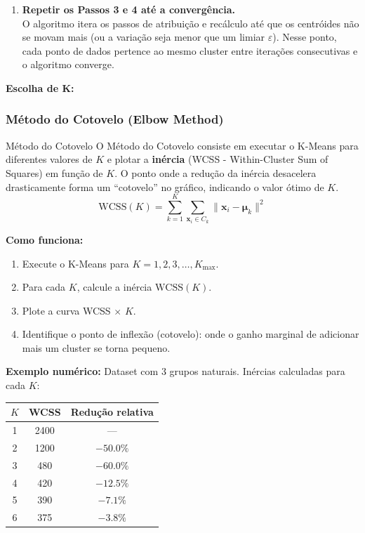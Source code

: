 \documentclass[12pt,a4paper]{article}
\begin{document}
\begin{enumerate}
  \item \textbf{Repetir os Passos 3 e 4 até a convergência.}\\
  O algoritmo itera os passos de atribuição e recálculo até que os centróides não se movam mais (ou a variação seja menor que um limiar $\varepsilon$). Nesse ponto, cada ponto de dados pertence ao mesmo cluster entre iterações consecutivas e o algoritmo converge.

\end{enumerate}

\textbf{Escolha de K:}

\subsubsection*{Método do Cotovelo (Elbow Method)}

\begin{definicaobox}{Método do Cotovelo}
O Método do Cotovelo consiste em executar o K-Means para diferentes valores de $K$ e plotar a \textbf{inércia} (WCSS - Within-Cluster Sum of Squares) em função de $K$. O ponto onde a redução da inércia desacelera drasticamente forma um ``cotovelo'' no gráfico, indicando o valor ótimo de $K$.
\[
  \text{WCSS}(K) = \sum_{k=1}^{K} \sum_{\mathbf{x}_i \in C_k} \|\mathbf{x}_i - \boldsymbol{\mu}_k\|^2
\]
\end{definicaobox}

\textbf{Como funciona:}
\begin{enumerate}
  \item Execute o K-Means para $K = 1, 2, 3, \ldots, K_{\max}$.
  \item Para cada $K$, calcule a inércia $\text{WCSS}(K)$.
  \item Plote a curva WCSS $\times$ $K$.
  \item Identifique o ponto de inflexão (cotovelo): onde o ganho marginal de adicionar mais um cluster se torna pequeno.
\end{enumerate}

\textbf{Exemplo numérico:} Dataset com 3 grupos naturais. Inércias calculadas para cada $K$:

\begin{center}
\begin{tabular}{ccc}
\toprule
$K$ & WCSS & Redução relativa \\
\midrule
1 & 2400 & --- \\
2 & 1200 & $-50{.}0\%$ \\
3 & 480  & $-60{.}0\%$ \\
4 & 420  & $-12{.}5\%$ \\
5 & 390  & $-7{.}1\%$ \\
6 & 375  & $-3{.}8\%$ \\
\bottomrule
\end{tabular}
\end{center}
\end{document}
